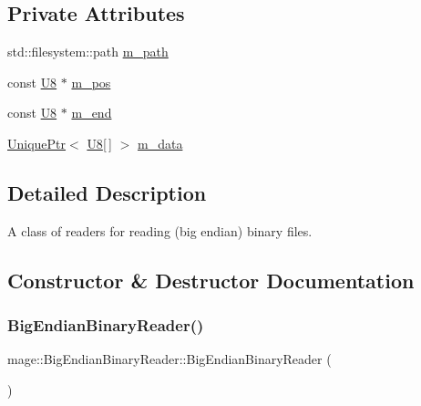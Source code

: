 \subsection*{Private Attributes}
\begin{DoxyCompactItemize}
\item 
std\+::filesystem\+::path \mbox{\hyperlink{classmage_1_1_big_endian_binary_reader_a4b8ac6558a16e53ee52c8a81b5b43b91}{m\+\_\+path}}
\item 
const \mbox{\hyperlink{namespacemage_a30677c03d683c4c35630c25f6ff3fb7f}{U8}} $\ast$ \mbox{\hyperlink{classmage_1_1_big_endian_binary_reader_a7dbfc5ce1712e431f75d80a4f7a56e33}{m\+\_\+pos}}
\item 
const \mbox{\hyperlink{namespacemage_a30677c03d683c4c35630c25f6ff3fb7f}{U8}} $\ast$ \mbox{\hyperlink{classmage_1_1_big_endian_binary_reader_ab4f707d30799b98afed0f9adfc27a3e2}{m\+\_\+end}}
\item 
\mbox{\hyperlink{namespacemage_a3316d7143a973e37adf1110f2e80ca31}{Unique\+Ptr}}$<$ \mbox{\hyperlink{namespacemage_a30677c03d683c4c35630c25f6ff3fb7f}{U8}}\mbox{[}$\,$\mbox{]} $>$ \mbox{\hyperlink{classmage_1_1_big_endian_binary_reader_a54128bdaa233c1bd20494189b2397fe3}{m\+\_\+data}}
\end{DoxyCompactItemize}


\subsection{Detailed Description}
A class of readers for reading (big endian) binary files. 

\subsection{Constructor \& Destructor Documentation}
\mbox{\label{classmage_1_1_big_endian_binary_reader_a1fd0dbee6950a8cb04aa399f0cdbaf2a}} 
\subsubsection{\texorpdfstring{Big\+Endian\+Binary\+Reader()}{BigEndianBinaryReader()}\hspace{0.1cm}{\footnotesize\ttfamily [1/3]}}
{\footnotesize\ttfamily mage\+::\+Big\+Endian\+Binary\+Reader\+::\+Big\+Endian\+Binary\+Reader (\begin{DoxyParamCaption}{ }\end{DoxyParamCaption})\hspace{0.3cm}{\ttfamily [protected]}}

